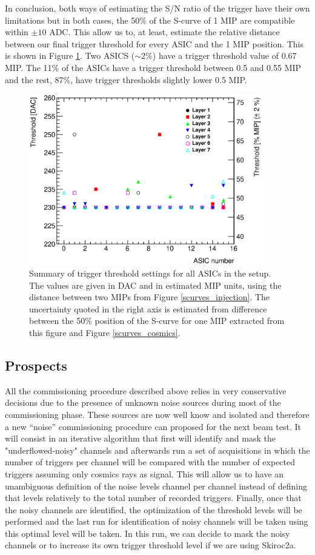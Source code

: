 \documentclass[a4paper,11pt]{article}
\begin{document}
In conclusion, both ways of estimating the S/N ratio of the trigger have their own limitations but in 
both cases, the 50\% of the S-curve of 1 MIP are compatible within $\pm10$ ADC. This allow us
to, at least, estimate the relative distance between our final trigger threshold for every ASIC and 
the 1 MIP position. This is shown in Figure \ref{trigger_thresholds}. Two ASICS ($\sim2\%$) have a
trigger threshold value of 0.67 MIP. The 11\% of the ASICs have a trigger threshold between 0.5 and 0.55 MIP and the rest, 87\%, have trigger thresholds slightly lower 0.5 MIP.

\begin{figure}[!t]
  \centering
  \includegraphics[width=4in]{figs/commissioning/threshold_chip.eps}
  \caption{Summary of trigger threshold settings for all ASICs in the setup. The values are given in DAC and in estimated MIP units, using the distance between two MIPs from Figure \ref{scurves_injection}. The uncertainty quoted in the right axis is estimated from difference between the 50\% position of the S-curve for one MIP extracted from this figure and Figure \ref{scurves_cosmics}.}
\label{trigger_thresholds}
\end{figure}


\subsection{Prospects}
\label{sec:comm_prospects}

All the commissioning procedure described above relies in very conservative decisions
due to the presence of unknown noise sources during most of the commissioning phase. These sources are
now well know and isolated and therefore a new ``noise'' commissioning procedure can proposed
for the next beam test. It will consist in an iterative algorithm that first
will identify and mask the "underflowed-noisy" channels and afterwards run a set of acquisitions
in which the number of triggers per channel will be compared with the number of expected triggers
assuming only cosmics rays as signal. This will allow us to have an
unambiguous definition of the noise levels channel per channel instead of 
defining that levels relatively to the total number
of recorded triggers. Finally, once that the noisy channels
are identified, the optimization of the threshold levels
will be performed and the last run for identification of noisy channels will be taken using this optimal
level will be taken. In this run, we can decide to mask the noisy channels or
to increase its own trigger threshold level if we are using Skiroc2a.
\end{document}
